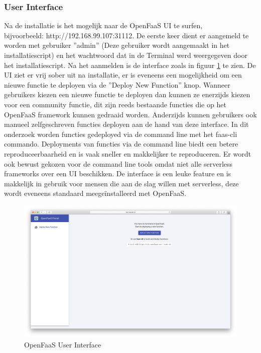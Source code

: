 \subsubsection{User Interface}
Na de installatie is het mogelijk naar de OpenFaaS UI te surfen, \\bijvoorbeeld: http://192.168.99.107:31112. 
De eerste keer dient er aangemeld te worden met gebruiker ''admin'' (Deze gebruiker wordt aangemaakt in het installatiescript) en het wachtwoord dat in de Terminal werd weergegeven door het installatiescript. Na het aanmelden is de interface zoals in figuur \ref{fig:openfaas-ui} te zien. De UI ziet er vrij sober uit na installatie, er is eveneens een mogelijkheid om een nieuwe functie te deployen via de ''Deploy New Function'' knop. Wanneer gebruikers kiezen een nieuwe functie te deployen dan kunnen ze enerzijds kiezen voor een community functie, dit zijn reeds bestaande functies die op het OpenFaaS framework kunnen gedraaid worden. Anderzijds kunnen gebruikers ook manueel zelfgeschreven functies deployen aan de hand van deze interface. In dit onderzoek worden functies gedeployed via de command line met het faas-cli commando. Deployments van functies via de command line biedt een betere reproduceerbaarheid en is vaak sneller en makkelijker te reproduceren. Er wordt ook bewust gekozen voor de command line tools omdat niet alle serverless frameworks over een UI beschikken. De interface is een leuke feature en is makkelijk in gebruik voor mensen die aan de slag willen met serverless, deze wordt eveneens standaard meegeïnstalleerd met OpenFaaS.
\begin{figure}
    \includegraphics[width=1\textwidth]{img/openfaas-ui.png}
    \caption{OpenFaaS User Interface}
    \label{fig:openfaas-ui}  
\end{figure}

